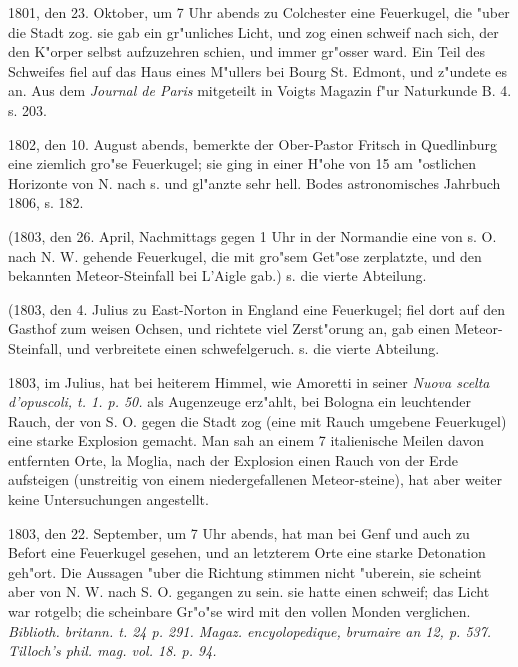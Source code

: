 \documentclass[a4paper, 11pt, oneside, polutonikogreek, german]{article}
\begin{document}
1801, den 23. Oktober, um 7 Uhr abends zu Colchester eine Feuerkugel, die "uber die Stadt zog. sie gab ein gr"unliches Licht, und zog einen schweif nach sich, der den K"orper selbst aufzuzehren schien, und immer gr"osser ward. Ein Teil des Schweifes fiel auf das Haus eines M"ullers bei Bourg St. Edmont, und z"undete es an. Aus dem \emph{Journal de Paris} mitgeteilt in Voigts Magazin f"ur Naturkunde B. 4. s. 203.

1802, den 10. August abends, bemerkte der Ober-Pastor Fritsch in Quedlinburg eine ziemlich gro"se Feuerkugel; sie ging in einer H"ohe von 15 am "ostlichen Horizonte von N. nach s. und gl"anzte sehr hell. Bodes astronomisches Jahrbuch 1806, s. 182.

(1803, den 26. April, Nachmittags gegen 1 Uhr in der Normandie eine von s. O. nach N. W. gehende Feuerkugel, die mit gro"sem Get"ose zerplatzte, und den bekannten Meteor-Steinfall bei L'Aigle gab.) s. die vierte Abteilung.

(1803, den 4. Julius zu East-Norton in England eine Feuerkugel; fiel dort auf den Gasthof zum weisen Ochsen, und richtete viel Zerst"orung an, gab einen Meteor-Steinfall, und verbreitete einen schwefelgeruch. s. die vierte Abteilung.

1803, im Julius, hat bei heiterem Himmel, wie Amoretti in seiner \emph{Nuova scelta d'opuscoli, t. 1. p. 50.} als Augenzeuge erz"ahlt, bei Bologna ein leuchtender Rauch, der von S. O. gegen die Stadt zog (eine mit Rauch umgebene Feuerkugel) eine starke Explosion gemacht. Man sah an einem 7 italienische Meilen davon entfernten Orte, la Moglia, nach der Explosion einen Rauch von der Erde aufsteigen (unstreitig von einem niedergefallenen Meteor-steine), hat aber weiter keine Untersuchungen angestellt.

1803, den 22. September, um 7 Uhr abends, hat man bei Genf und auch zu Befort eine Feuerkugel gesehen, und an letzterem Orte eine starke Detonation geh"ort. Die Aussagen "uber die Richtung stimmen nicht "uberein, sie scheint aber von N. W. nach S. O. gegangen zu sein. sie hatte einen schweif; das Licht war rotgelb; die scheinbare Gr"o"se wird mit den vollen Monden verglichen. \emph{Biblioth. britann. t. 24 p. 291. Magaz. encyolopedique, brumaire an 12, p. 537. Tilloch's phil. mag. vol. 18. p. 94.}
\end{document}

